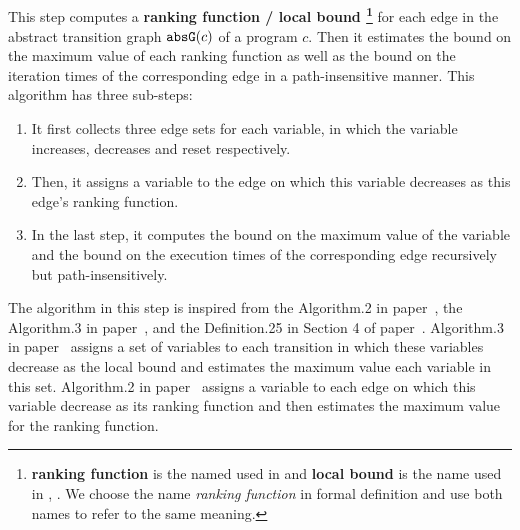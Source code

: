 \subsection{}
\label{sec:pathsensitive_rb-lbcompute}
This step computes a 
\textbf{ranking function / local bound 
\footnote{\textbf{ranking function} is the named used in \cite{SinnZV14}
and \textbf{local bound} is the name used in \cite{ZulegerGSV11}, \cite{sinn2017complexity}.
We choose the name \emph{ranking function} in formal definition and use both names to refer to the same meaning.
}}
for each edge in the abstract transition graph $\mathtt{abs}{\mathtt{G}}(c)$ of a program $c$.
Then it estimates the bound on the maximum value of each ranking function   as well as
the bound on the iteration times of the corresponding edge in a path-insensitive manner.
This algorithm has three sub-steps:
\begin{enumerate}
  \item It first collects three edge sets for each variable,
in which the variable increases, decreases and reset respectively.
\item
Then, it assigns a variable to the edge on which this variable decreases as this edge's ranking function.
\item
In the last step, it computes the bound on the maximum value of the variable and the bound on the execution
times of the corresponding edge recursively but path-insensitively.
\end{enumerate}
The algorithm in this step is inspired from the Algorithm.2 in paper~\cite{SinnZV14},
the Algorithm.3 in paper~\cite{ZulegerGSV11},
and the Definition.25 in Section 4 of paper~\cite{sinn2017complexity}.
Algorithm.3 in paper~\cite{ZulegerGSV11} assigns a set of variables to each transition in which these variables decrease as the local bound
and estimates the maximum value each variable in this set.
Algorithm.2 in paper~\cite{SinnZV14} assigns a variable to each edge on which this variable decrease as its ranking function
and then estimates the maximum value for the ranking function.
